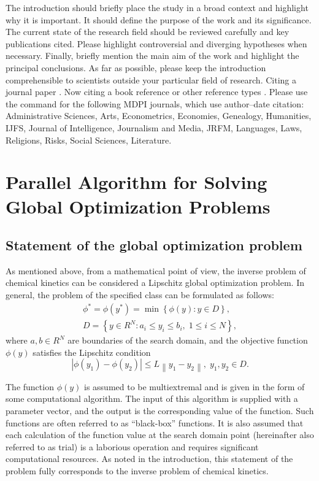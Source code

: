 \documentclass[mathematics,article,submit,pdftex,moreauthors]{Definitions/mdpi}
\begin{document}
The introduction should briefly place the study in a broad context and highlight why it is important. It should define the purpose of the work and its significance. The current state of the research field should be reviewed carefully and key publications cited. Please highlight controversial and diverging hypotheses when necessary. Finally, briefly mention the main aim of the work and highlight the principal conclusions. As far as possible, please keep the introduction comprehensible to scientists outside your particular field of research. Citing a journal paper \cite{ref-journal}. Now citing a book reference \cite{ref-book1,ref-book2} or other reference types \cite{ref-unpublish,ref-communication,ref-proceeding}. Please use the command \citep{ref-thesis,ref-url} for the following MDPI journals, which use author--date citation: Administrative Sciences, Arts, Econometrics, Economies, Genealogy, Humanities, IJFS, Journal of Intelligence, Journalism and Media, JRFM, Languages, Laws, Religions, Risks, Social Sciences, Literature.


\section{Parallel Algorithm for Solving Global Optimization Problems }\label{Sec_GSA}

\subsection{Statement of the global optimization problem}

As mentioned above, from a mathematical point of view, the inverse problem of chemical kinetics can be considered a Lipschitz global optimization problem. 
In general, the problem of the specified class can be formulated as follows:
\begin{gather}
 \phi^* = \phi(y^\ast)=\min{\left\{\phi(y):y\in D\right\}}, \label{problemN}\\
 D=\left\{y\in R^N: a_i\leq y_i \leq b_i, \;  1\leq i \leq N\right\} \label{D},
\end{gather}
where $a,b \in R^N$ are boundaries of the search domain, and the objective function $\phi(y)$ satisfies the Lipschitz condition
\begin{equation}\label{Lip}
\left|\phi(y_1)-\phi(y_2)\right|\leq L\left\|y_1-y_2\right\|,\; y_1,y_2 \in D.
\end{equation}

The function $\phi(y)$ is assumed to be multiextremal and is given in the form of some computational algorithm. The input of this algorithm is supplied with a parameter vector, and the output is the corresponding value of the function. Such functions are often referred to as ``black-box'' functions. It is also assumed that each calculation of the function value at the search domain point (hereinafter also referred to as trial) is a laborious operation and requires significant computational resources. As noted in the introduction, this statement of the problem fully corresponds to the inverse problem of chemical kinetics.
\end{document}
